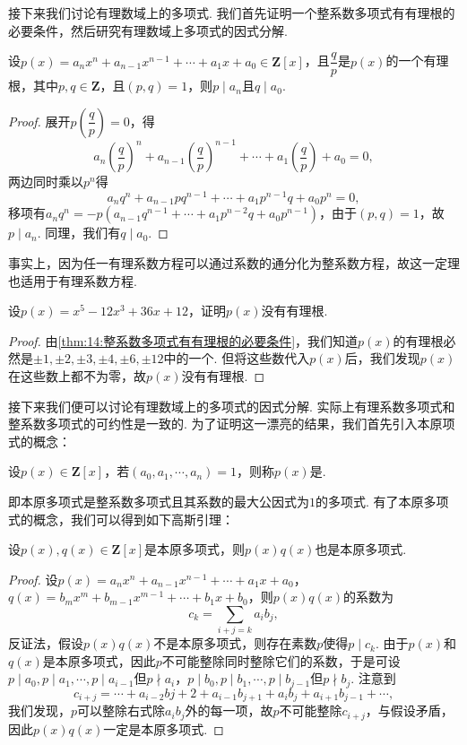 接下来我们讨论有理数域上的多项式. 我们首先证明一个整系数多项式有有理根的必要条件，然后研究有理数域上多项式的因式分解.
\begin{theorem} \label{thm:14:整系数多项式有有理根的必要条件}
    设$p(x)=a_nx^n+a_{n-1}x^{n-1}+\cdots+a_1x+a_0\in\mathbf{Z}[x]$，且$\dfrac{q}{p}$是$p(x)$的一个有理根，其中$p,q\in\mathbf{Z}$，且$(p,q)=1$，则$p\mid a_n$且$q\mid a_0$.
\end{theorem}
\begin{proof}
    展开$p\left(\dfrac{q}{p}\right)=0$，得
    \[a_n\left(\dfrac{q}{p}\right)^n+a_{n-1}\left(\dfrac{q}{p}\right)^{n-1}+\cdots+a_1\left(\dfrac{q}{p}\right)+a_0=0,\]
    两边同时乘以$p^n$得
    \[a_nq^n+a_{n-1}pq^{n-1}+\cdots+a_1p^{n-1}q+a_0p^n=0,\]
    移项有$a_nq^n=-p(a_{n-1}q^{n-1}+\cdots+a_1p^{n-2}q+a_0p^{n-1})$，由于$(p,q)=1$，故$p\mid a_n$. 同理，我们有$q\mid a_0$.
\end{proof}

事实上，因为任一有理系数方程可以通过系数的通分化为整系数方程，故这一定理也适用于有理系数方程.
\begin{example}
    设$p(x)=x^5-12x^3+36x+12$，证明$p(x)$没有有理根.
\end{example}
\begin{proof}
    由\autoref{thm:14:整系数多项式有有理根的必要条件}，我们知道$p(x)$的有理根必然是$\pm 1,\pm 2,\pm 3,\pm 4,\pm 6,\pm 12$中的一个. 但将这些数代入$p(x)$后，我们发现$p(x)$在这些数上都不为零，故$p(x)$没有有理根.
\end{proof}

接下来我们便可以讨论有理数域上的多项式的因式分解. 实际上有理系数多项式和整系数多项式的可约性是一致的. 为了证明这一漂亮的结果，我们首先引入本原项式的概念：
\begin{definition}
    设$p(x)\in\mathbf{Z}[x]$，若$(a_0,a_1,\cdots,a_n)=1$，则称$p(x)$是.
\end{definition}
即本原多项式是整系数多项式且其系数的最大公因式为$1$的多项式. 有了本原多项式的概念，我们可以得到如下高斯引理：
\begin{lemma}[高斯引理] \label{lem:14:高斯引理}
    设$p(x),q(x)\in\mathbf{Z}[x]$是本原多项式，则$p(x)q(x)$也是本原多项式.
\end{lemma}
\begin{proof}
    设$p(x)=a_nx^n+a_{n-1}x^{n-1}+\cdots+a_1x+a_0$，$q(x)=b_mx^m+b_{m-1}x^{m-1}+\cdots+b_1x+b_0$，则$p(x)q(x)$的系数为
    \[c_k=\sum_{i+j=k}a_ib_j,\]
    反证法，假设$p(x)q(x)$不是本原多项式，则存在素数$p$使得$p\mid c_k$. 由于$p(x)$和$q(x)$是本原多项式，因此$p$不可能整除同时整除它们的系数，于是可设$p\mid a_0,p\mid a_1,\cdots,p\mid a_{i-1}$但$p\nmid a_i$，$p\mid b_0,p\mid b_1,\cdots,p\mid b_{j-1}$但$p\nmid b_j$. 注意到
    \[c_{i+j}=\cdots+a_{i-2}b{j+2}+a_{i-1}b_{j+1}+a_ib_j+a_{i+1}b_{j-1}+\cdots,\]
    我们发现，$p$可以整除右式除$a_ib_j$外的每一项，故$p$不可能整除$c_{i+j}$，与假设矛盾，因此$p(x)q(x)$一定是本原多项式.
\end{proof}

